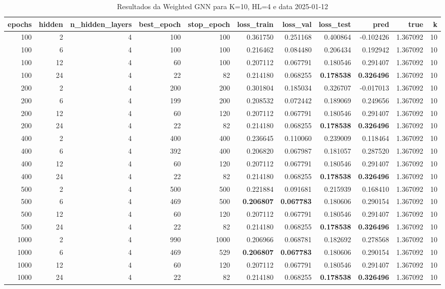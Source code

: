 \begin{table}
\caption{Resultados da Weighted GNN para K=10, HL=4 e data 2025-01-12}
\label{tab:weighted_gnn_results_k10_hl4_d20250112}
\begin{tabular}{rrrrrrrrrrr}
\toprule
epochs & hidden & n\_hidden\_layers & best\_epoch & stop\_epoch & loss\_train & loss\_val & loss\_test & pred & true & k \\
\midrule
100 & 2 & 4 & 100 & 100 & 0.361750 & 0.251168 & 0.400864 & -0.102426 & 1.367092 & 10 \\
100 & 6 & 4 & 100 & 100 & 0.216462 & 0.084480 & 0.206434 & 0.192942 & 1.367092 & 10 \\
100 & 12 & 4 & 60 & 100 & 0.207112 & 0.067791 & 0.180546 & 0.291407 & 1.367092 & 10 \\
100 & 24 & 4 & 22 & 82 & 0.214180 & 0.068255 & \textbf{0.178538} & \textbf{0.326496} & 1.367092 & 10 \\
200 & 2 & 4 & 200 & 200 & 0.301804 & 0.185034 & 0.326707 & -0.017013 & 1.367092 & 10 \\
200 & 6 & 4 & 199 & 200 & 0.208532 & 0.072442 & 0.189069 & 0.249656 & 1.367092 & 10 \\
200 & 12 & 4 & 60 & 120 & 0.207112 & 0.067791 & 0.180546 & 0.291407 & 1.367092 & 10 \\
200 & 24 & 4 & 22 & 82 & 0.214180 & 0.068255 & \textbf{0.178538} & \textbf{0.326496} & 1.367092 & 10 \\
400 & 2 & 4 & 400 & 400 & 0.236645 & 0.110060 & 0.239009 & 0.118464 & 1.367092 & 10 \\
400 & 6 & 4 & 392 & 400 & 0.206820 & 0.067987 & 0.181057 & 0.287520 & 1.367092 & 10 \\
400 & 12 & 4 & 60 & 120 & 0.207112 & 0.067791 & 0.180546 & 0.291407 & 1.367092 & 10 \\
400 & 24 & 4 & 22 & 82 & 0.214180 & 0.068255 & \textbf{0.178538} & \textbf{0.326496} & 1.367092 & 10 \\
500 & 2 & 4 & 500 & 500 & 0.221884 & 0.091681 & 0.215939 & 0.168410 & 1.367092 & 10 \\
500 & 6 & 4 & 469 & 500 & \textbf{0.206807} & \textbf{0.067783} & 0.180606 & 0.290154 & 1.367092 & 10 \\
500 & 12 & 4 & 60 & 120 & 0.207112 & 0.067791 & 0.180546 & 0.291407 & 1.367092 & 10 \\
500 & 24 & 4 & 22 & 82 & 0.214180 & 0.068255 & \textbf{0.178538} & \textbf{0.326496} & 1.367092 & 10 \\
1000 & 2 & 4 & 990 & 1000 & 0.206966 & 0.068781 & 0.182692 & 0.278568 & 1.367092 & 10 \\
1000 & 6 & 4 & 469 & 529 & \textbf{0.206807} & \textbf{0.067783} & 0.180606 & 0.290154 & 1.367092 & 10 \\
1000 & 12 & 4 & 60 & 120 & 0.207112 & 0.067791 & 0.180546 & 0.291407 & 1.367092 & 10 \\
1000 & 24 & 4 & 22 & 82 & 0.214180 & 0.068255 & \textbf{0.178538} & \textbf{0.326496} & 1.367092 & 10 \\
\bottomrule
\end{tabular}
\end{table}

